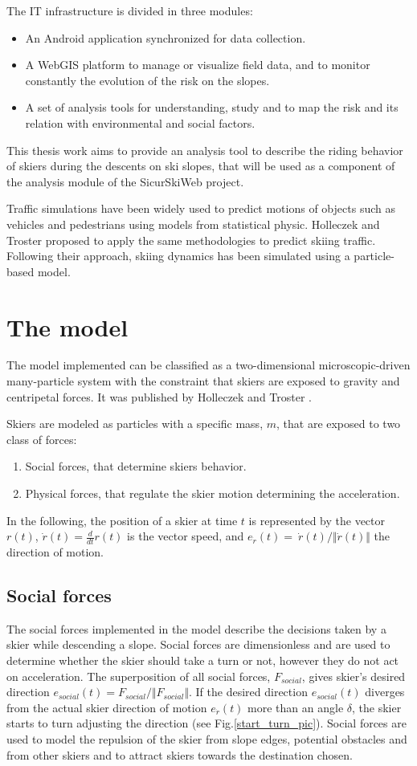 \documentclass[12pt,a4paper,twoside]{book}
\begin{document}
The IT infrastructure is divided in three modules:
\begin{itemize}
\item An Android application synchronized for data collection.
\item A WebGIS platform to manage or visualize field data, and to monitor constantly the evolution of the risk on the slopes.
\item A set of analysis tools for understanding, study and to map the risk and its relation with environmental and social factors.
\end{itemize}
This thesis work aims to provide an analysis tool to describe the riding behavior of skiers during the descents on ski slopes, that will be used as a component of the analysis module of the SicurSkiWeb project.

Traffic simulations have been widely used to predict motions of objects such as vehicles and pedestrians using models from statistical physic. Holleczek and Troster proposed to apply the same methodologies to predict skiing traffic. Following their approach, skiing dynamics has been simulated using a particle-based model.

\chapter{The model}\label{model}
The model implemented can be classified as a two-dimensional microscopic-driven many-particle system with the constraint that skiers are exposed to gravity and centripetal forces. It was published by Holleczek and Troster \cite{hol2012}.

Skiers are modeled as particles with a specific mass, $m$, that are exposed to two class of forces:\begin{enumerate}
\item Social forces, that determine skiers behavior.
\item Physical forces, that regulate the skier motion determining the acceleration.
\end{enumerate}
In the following, the position of a skier at time $t$ is represented by the vector $r(t)$, $\dot{r}(t)=\frac{d}{dt}r(t)$ is the vector speed, and $e_{\dot{r}}(t)=\ \dot{r}(t) / \Vert \dot{r}(t)\Vert$ the direction of motion.

\section{Social forces}
The social forces implemented in the model describe the decisions taken by a skier while descending a slope. Social forces are dimensionless and are used to determine whether the skier should take a turn or not, however they do not act on acceleration. The superposition of all social forces, $F_{social}$, gives skier's desired direction $e_{social}(t)=F_{social} / \Vert F_{social} \Vert$. If the desired direction $e_{social}(t)$ diverges from the actual skier direction of motion $e_{\dot{r}}(t)$ more than an angle ${\delta}$, the skier starts to turn adjusting the direction (see Fig.\ref{start_turn_pic}). Social forces are used to model the repulsion of the skier from slope edges, potential obstacles and from other skiers and to attract skiers towards the destination chosen.
\end{document}
